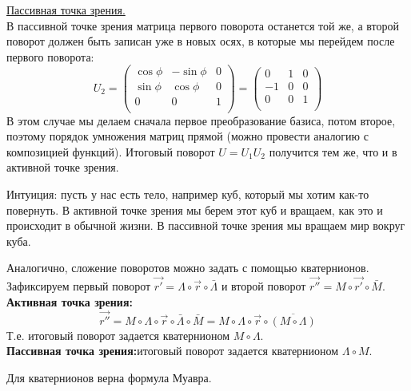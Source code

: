 \begin{example}
    \underline{Пассивная точка зрения.}\\
    В пассивной точке зрения матрица первого поворота останется той же, а второй поворот должен быть записан уже в новых осях, в которые мы перейдем после первого поворота:
    \[
    U_2 = \begin{pmatrix}
        \cos{\phi} & -\sin{\phi} & 0\\
        \sin{\phi} & \cos{\phi} & 0\\
        0 & 0 & 1\\
    \end{pmatrix} = \begin{pmatrix}
        0 & 1 & 0\\
        -1 & 0 & 0\\
        0 & 0 & 1\\
    \end{pmatrix}
    \]
    В этом случае мы делаем сначала первое преобразование базиса, потом второе, поэтому порядок умножения матриц прямой (можно провести аналогию с композицией функций). Итоговый поворот $U = U_1U_2$ получится тем же, что и в активной точке зрения.
\end{example}

\begin{note}
    Интуиция: пусть у нас есть тело, например куб, который мы хотим как-то повернуть. В активной точке зрения мы берем этот куб и вращаем, как это и происходит в обычной жизни. В пассивной точке зрения мы вращаем мир вокруг куба.\\
\end{note}

Аналогично, сложение поворотов можно задать с помощью кватернионов. Зафиксируем первый поворот $\vec{r'} = \Lambda \circ \vec{r} \circ \bar\Lambda$ и второй поворот $\vec{r''} = M \circ \vec{r'} \circ \bar M$.\\

\textbf{Активная точка зрения:}
\[
\vec{r''} = M\circ\Lambda\circ\vec{r}\circ\bar\Lambda\circ\bar M = M \circ \Lambda\circ \vec{r} \circ\overline{(M\circ\Lambda)}
\]
Т.е. итоговый поворот задается кватернионом $M \circ\Lambda$.\\
\textbf{Пассивная точка зрения:}итоговый поворот задается кватернионом $\Lambda \circ M$.\\


\begin{note}
    Для кватернионов верна формула Муавра.
\end{note}

